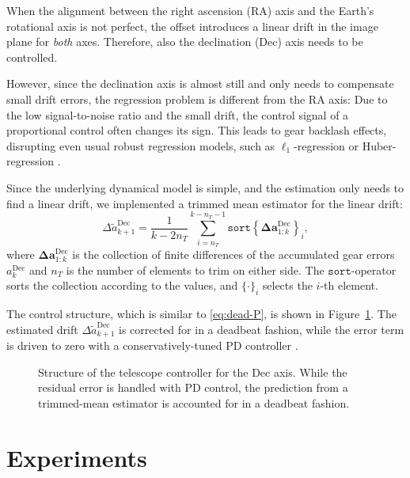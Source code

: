 When the alignment between the right ascension (RA) axis and the Earth's
rotational axis is not perfect, the offset introduces a linear drift in the
image plane for \emph{both} axes. Therefore, also the declination (Dec) axis
needs to be controlled.

However, since the declination axis is almost still and only needs to
compensate small drift errors, the regression problem is different from the RA
axis: Due to the low signal-to-noise ratio and the small drift, the control
signal of a proportional control often changes its sign. This leads to gear
backlash effects, disrupting even usual robust regression models, such as
$\ell_1$-regression or Huber-regression \cite{Huber:1964:Robust}.

Since the underlying dynamical model is simple, and the estimation only needs to
find a linear drift, we implemented a trimmed mean estimator for the linear
drift:
\begin{equation}
  \Delta \tilde a^\text{Dec}_{k+1} = \frac{1}{k-2n_T}
    \sum_{i=n_T}^{k-n_T-1} \mathtt{sort}\left\{\mathbf{\Delta
a}^\text{Dec}_{1:k}
  \right\}_i,
\end{equation}
where $\mathbf{\Delta a}_{1:k}^\text{Dec}$ is the collection of finite
differences of the accumulated gear errors $a_k^\text{Dec}$ and $n_T$ is the
number of elements to trim on either side. The $\mathtt{sort}$-operator sorts
the collection according to the values, and $\{\cdot\}_i$ selects the $i$-th
element.

The control structure, which is similar to \eqref{eq:dead-P}, is
shown in Figure~\ref{fig:TM_controller}. The estimated drift
$\Delta \tilde a^\text{Dec}_{k+1}$ is corrected for in a deadbeat
fashion, while the error term is driven to zero with a conservatively-tuned PD
controller \cite{Astrom.Hagglund:1995:Theory}.

\begin{figure}%
  \center%
  \caption[Structure of the telescope controller for the Dec axis.]{
Structure of the telescope controller for the Dec axis. While the residual error
is handled with PD control, the prediction from a trimmed-mean estimator is
accounted for in a deadbeat fashion.}
  \label{fig:TM_controller}
\end{figure}

\section{Experiments}
\label{sec:phd-guiding-experiments}

